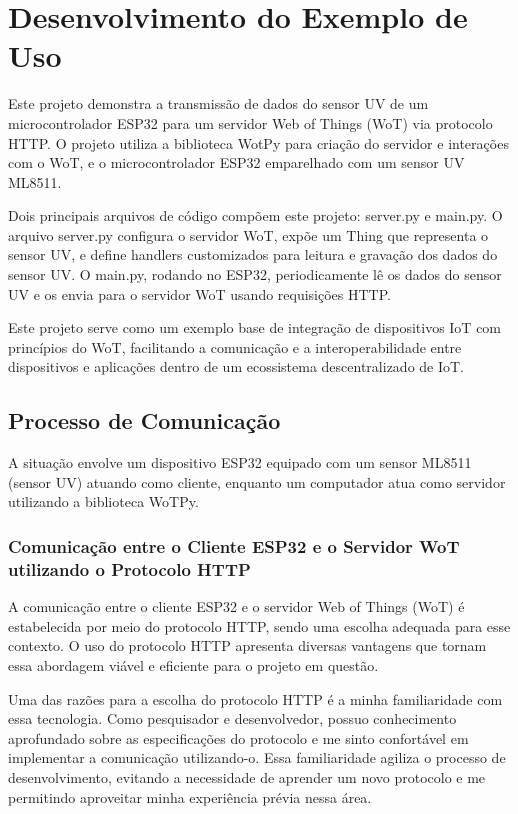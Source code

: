 \section{Desenvolvimento do Exemplo de Uso}

Este projeto demonstra a transmissão de dados do sensor UV de um microcontrolador ESP32 para um servidor Web of Things (WoT) via protocolo HTTP. O projeto utiliza a biblioteca WotPy para criação do servidor e interações com o WoT, e o microcontrolador ESP32 emparelhado com um sensor UV ML8511.

Dois principais arquivos de código compõem este projeto: server.py e main.py. O arquivo server.py configura o servidor WoT, expõe um Thing que representa o sensor UV, e define handlers customizados para leitura e gravação dos dados do sensor UV. O main.py, rodando no ESP32, periodicamente lê os dados do sensor UV e os envia para o servidor WoT usando requisições HTTP.

Este projeto serve como um exemplo base de integração de dispositivos IoT com princípios do WoT, facilitando a comunicação e a interoperabilidade entre dispositivos e aplicações dentro de um ecossistema descentralizado de IoT.

\subsection{Processo de Comunicação}

A situação envolve um dispositivo ESP32 equipado com um sensor ML8511 (sensor UV) atuando como cliente, enquanto um computador atua como servidor utilizando a biblioteca WoTPy.

\subsubsection{Comunicação entre o Cliente ESP32 e o Servidor WoT utilizando o Protocolo HTTP}

A comunicação entre o cliente ESP32 e o servidor Web of Things (WoT) é estabelecida por meio do protocolo HTTP, sendo uma escolha adequada para esse contexto. O uso do protocolo HTTP apresenta diversas vantagens que tornam essa abordagem viável e eficiente para o projeto em questão.

Uma das razões para a escolha do protocolo HTTP é a minha familiaridade com essa tecnologia. Como pesquisador e desenvolvedor, possuo conhecimento aprofundado sobre as especificações do protocolo e me sinto confortável em implementar a comunicação utilizando-o. Essa familiaridade agiliza o processo de desenvolvimento, evitando a necessidade de aprender um novo protocolo e me permitindo aproveitar minha experiência prévia nessa área.

